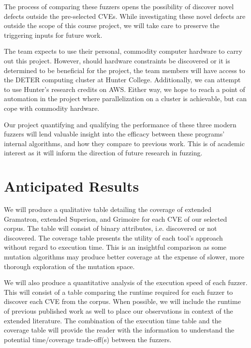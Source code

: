 \documentclass[12pt]{diazessay}
\begin{document}
The process of comparing these fuzzers opens the possibility of discover novel defects outside the pre-selected CVEs.
While investigating these novel defects are outside the scope of this course project, we will take care to preserve the triggering inputs for future work.

The team expects to use their personal, commodity computer hardware to carry out this project.
However, should hardware constraints be discovered or it is determined to be beneficial for the project, the team members will have access to the DETER computing cluster at Hunter College.
Additionally, we can attempt to use Hunter's research credits on AWS.
Either way, we hope to reach a point of automation in the project where parallelization on a cluster is achievable, but can cope with commodity hardware.

Our project quantifying and qualifying the performance of these three modern fuzzers will lend valuable insight into the efficacy between these programs' internal algorithms, and how they compare to previous work.
This is of academic interest as it will inform the direction of future research in fuzzing.


\vspace{-0.25cm}
\section*{Anticipated Results}
\label{results}
\vspace{-0.25cm}

We will produce a qualitative table detailing the coverage of extended Gramatron, extended Superion, and Grimoire for each CVE of our selected corpus.
The table will consist of binary attributes, i.e. discovered or not discovered.
The coverage table presents the utility of each tool's approach without regard to execution time.
This is an insightful comparison as some mutation algorithms may produce better coverage at the expense of slower, more thorough exploration of the mutation space.

We will also produce a quantitative analysis of the execution speed of each fuzzer.
This will consist of a table comparing the runtime required for each fuzzer to discover each CVE from the corpus.
When possible, we will include the runtime of previous published work as well to place our observations in context of the extended literature.
The combination of the execution time table and the coverage table will provide the reader with the information to understand the potential time/coverage trade-off(s) between the fuzzers.
\end{document}
